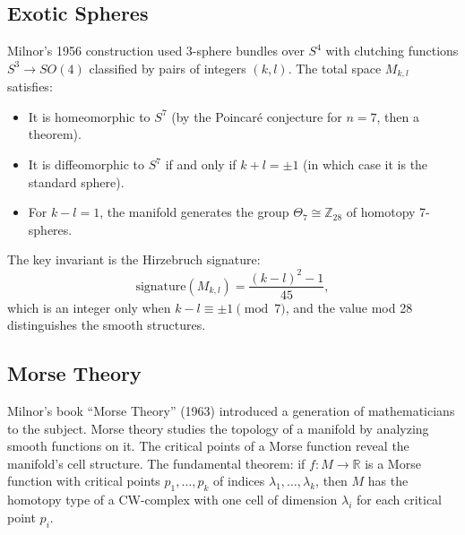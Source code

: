 \subsection{Exotic Spheres}

Milnor's 1956 construction used 3-sphere bundles over $S^4$ with clutching functions $S^3 \to SO(4)$ classified by pairs of integers $(k,l)$. The total space $M_{k,l}$ satisfies:
\begin{itemize}
\item It is homeomorphic to $S^7$ (by the Poincar\'e conjecture for $n=7$, then a theorem).
\item It is diffeomorphic to $S^7$ if and only if $k + l = \pm 1$ (in which case it is the standard sphere).
\item For $k-l = 1$, the manifold generates the group $\Theta_7 \cong \mathbb{Z}_{28}$ of homotopy 7-spheres.
\end{itemize}

The key invariant is the Hirzebruch signature:
\[
\text{signature}(M_{k,l}) = \frac{(k-l)^2 - 1}{45},
\]
which is an integer only when $k-l \equiv \pm 1 \pmod{7}$, and the value mod 28 distinguishes the smooth structures.

\subsection{Morse Theory}

Milnor's book ``Morse Theory'' (1963) introduced a generation of mathematicians to the subject. Morse theory studies the topology of a manifold by analyzing smooth functions on it. The critical points of a Morse function reveal the manifold's cell structure. The fundamental theorem: if $f: M \to \mathbb{R}$ is a Morse function with critical points $p_1, \ldots, p_k$ of indices $\lambda_1, \ldots, \lambda_k$, then $M$ has the homotopy type of a CW-complex with one cell of dimension $\lambda_i$ for each critical point $p_i$.


